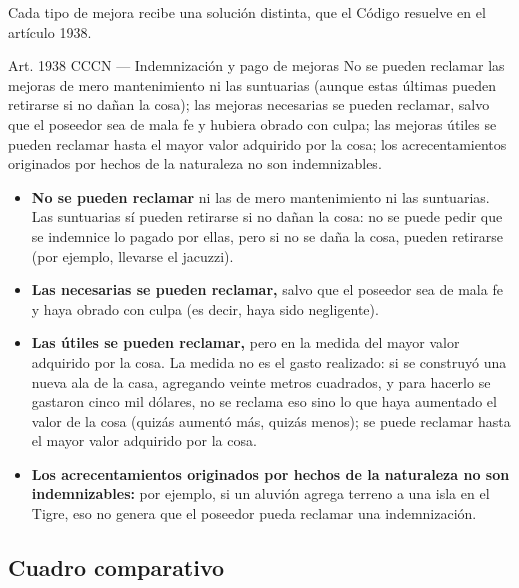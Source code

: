 \documentclass[12pt,oneside]{book}
\begin{document}
Cada tipo de mejora recibe una solución distinta, que el Código resuelve en el artículo 1938.

\begin{articulo}{Art. 1938 CCCN --- Indemnización y pago de mejoras}
No se pueden reclamar las mejoras de mero mantenimiento ni las suntuarias (aunque estas últimas pueden retirarse si no dañan la cosa); las mejoras necesarias se pueden reclamar, salvo que el poseedor sea de mala fe y hubiera obrado con culpa; las mejoras útiles se pueden reclamar hasta el mayor valor adquirido por la cosa; los acrecentamientos originados por hechos de la naturaleza no son indemnizables.
\end{articulo}

\begin{itemize}
    \item \textbf{No se pueden reclamar} ni las de mero mantenimiento ni las suntuarias. Las suntuarias sí pueden retirarse si no dañan la cosa: no se puede pedir que se indemnice lo pagado por ellas, pero si no se daña la cosa, pueden retirarse (por ejemplo, llevarse el jacuzzi).
    \item \textbf{Las necesarias se pueden reclamar,} salvo que el poseedor sea de mala fe y haya obrado con culpa (es decir, haya sido negligente).
    \item \textbf{Las útiles se pueden reclamar,} pero en la medida del mayor valor adquirido por la cosa. La medida no es el gasto realizado: si se construyó una nueva ala de la casa, agregando veinte metros cuadrados, y para hacerlo se gastaron cinco mil dólares, no se reclama eso sino lo que haya aumentado el valor de la cosa (quizás aumentó más, quizás menos); se puede reclamar hasta el mayor valor adquirido por la cosa.
    \item \textbf{Los acrecentamientos originados por hechos de la naturaleza no son indemnizables:} por ejemplo, si un aluvión agrega terreno a una isla en el Tigre, eso no genera que el poseedor pueda reclamar una indemnización.
\end{itemize}

\subsection*{Cuadro comparativo}
\end{document}
